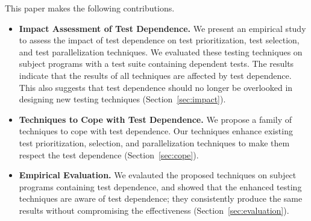 This paper makes the following contributions.

\begin{itemize}

\item \textbf{Impact Assessment of Test Dependence.}
We present an empirical study to assess the impact of test dependence
on \prionum test prioritization, \selnum test selection, and \parnum
test parallelization techniques. We evaluated these 
testing techniques on \subjnum subject programs with a test suite containing
dependent tests. The results indicate that the results of
all techniques are affected by test dependence. This also
suggests that test dependence should no longer be overlooked
in designing new testing techniques (Section~\ref{sec:impact}).

\item \textbf{Techniques to Cope with Test Dependence.}
We propose a family of techniques to cope with test dependence.
Our techniques enhance existing test prioritization, selection,
and parallelization techniques to make them respect the test dependence
(Section~\ref{sec:cope}). 

\item \textbf{Empirical Evaluation.} We evalauted the proposed
techniques on \subjnum subject programs containing test dependence, and
showed that the enhanced testing techniques are aware of test dependence;
they consistently produce the same results without compromising
the effectiveness (Section~\ref{sec:evaluation}).

\end{itemize}

